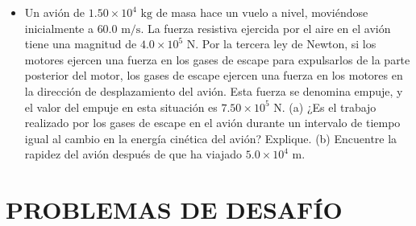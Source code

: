 \documentclass[11pt,a4paper]{article}
\begin{document}
\begin{itemize}
    \item[\textbf{39.}] Un avión de $1.50 \times 10^4 \text{ kg}$ de masa hace un vuelo a nivel, moviéndose inicialmente a $60.0 \text{ m/s}$. La fuerza resistiva ejercida por el aire en el avión tiene una magnitud de $4.0 \times 10^5 \text{ N}$. Por la tercera ley de Newton, si los motores ejercen una fuerza en los gases de escape para expulsarlos de la parte posterior del motor, los gases de escape ejercen una fuerza en los motores en la dirección de desplazamiento del avión. Esta fuerza se denomina empuje, y el valor del empuje en esta situación es $7.50 \times 10^5 \text{ N}$. (a) ¿Es el trabajo realizado por los gases de escape en el avión durante un intervalo de tiempo igual al cambio en la energía cinética del avión? Explique. (b) Encuentre la rapidez del avión después de que ha viajado $5.0 \times 10^4 \text{ m}$.
    \vspace*{6cm}
\end{itemize}

\newpage

\section*{PROBLEMAS DE DESAFÍO}
\end{document}
